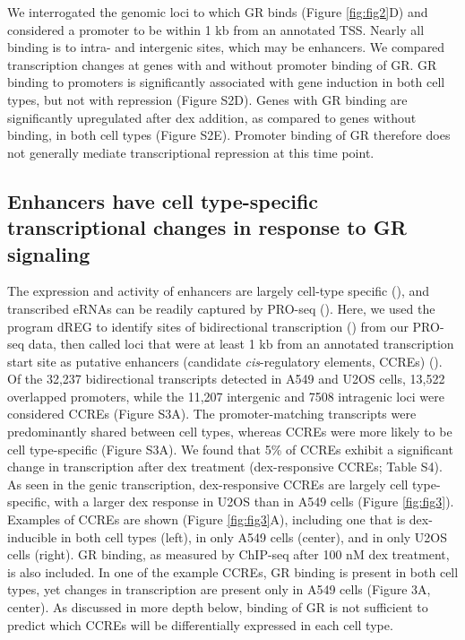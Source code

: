\documentclass{article}
\begin{document}
{We interrogated the genomic loci to which GR binds (Figure \ref{fig:fig2}D) and considered a promoter to be within 1 kb from an annotated TSS. Nearly all binding is to intra- and intergenic sites, which may be enhancers. We compared transcription changes at genes with and without promoter binding of GR. GR binding to promoters is significantly associated with gene induction in both cell types, but not with repression (Figure S2D). Genes with GR binding are significantly upregulated after dex addition, as compared to genes without binding, in both cell types (Figure S2E). Promoter binding of GR therefore does not generally mediate transcriptional repression at this time point.

\subsection*{Enhancers have cell type-specific transcriptional changes in response to GR signaling}

The expression and activity of enhancers are largely cell-type specific (\cite{andersson_atlas_2014}), and transcribed eRNAs can be readily captured by PRO-seq (\cite{wissink_nascent_2019}). Here, we used the program dREG to identify sites of bidirectional transcription (\cite{wang_identification_2019, chu_discovering_2019}) from our PRO-seq data, then called loci that were at least 1 kb from an annotated transcription start site as putative enhancers (candidate \emph{cis}-regulatory elements, CCREs) (\cite{moore_expanded_2020}). Of the 32,237 bidirectional transcripts detected in A549 and U2OS cells, 13,522 overlapped promoters, while the 11,207 intergenic and 7508 intragenic loci were considered CCREs (Figure S3A). The promoter-matching transcripts were predominantly shared between cell types, whereas CCREs were more likely to be cell type-specific (Figure S3A). We found that 5\% of CCREs exhibit a significant change in transcription after dex treatment (dex-responsive CCREs; Table S4). As seen in the genic transcription, dex-responsive CCREs are largely cell type-specific, with a larger dex response in U2OS than in A549 cells (Figure \ref{fig:fig3}). Examples of CCREs are shown (Figure \ref{fig:fig3}A), including one that is dex-inducible in both cell types (left), in only A549 cells (center), and in only U2OS cells (right). GR binding, as measured by ChIP-seq after 100 nM dex treatment, is also included. In one of the example CCREs, GR binding is present in both cell types, yet changes in transcription are present only in A549 cells (Figure 3A, center). As discussed in more depth below, binding of GR is not sufficient to predict which CCREs will be differentially expressed in each cell type.

}
\end{document}
